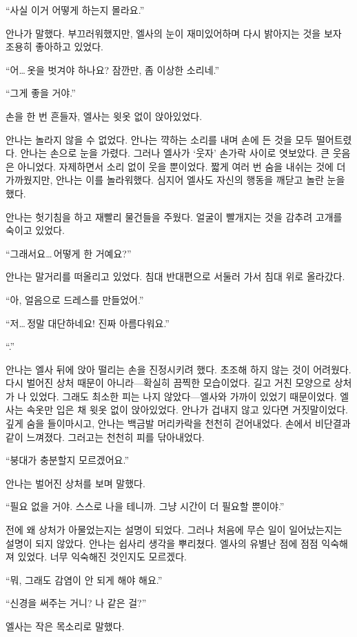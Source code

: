 ``사실 이거 어떻게 하는지 몰라요.''

안나가 말했다. 부끄러워했지만, 엘사의 눈이 재미있어하며 다시 밝아지는 것을 보자 조용히 좋아하고 있었다.

``어\ldots\,옷을 벗겨야 하나요? 잠깐만, 좀 이상한 소리네.''

``그게 좋을 거야.''

손을 한 번 흔들자, 엘사는 윗옷 없이 앉아있었다.

안나는 놀라지 않을 수 없었다. 안나는 꺅하는 소리를 내며 손에 든 것을 모두 떨어트렸다. 안나는 손으로 눈을 가렸다. 그러나 엘사가 `웃자' 손가락 사이로 엿보았다. 큰 웃음은 아니었다. 자제하면서 소리 없이 웃을 뿐이었다. 짧게 여러 번 숨을 내쉬는 것에 더 가까웠지만, 안나는 이를 놀라워했다. 심지어 엘사도 자신의 행동을 깨닫고 놀란 눈을 했다.

안나는 헛기침을 하고 재빨리 물건들을 주웠다. 얼굴이 빨개지는 것을 감추려 고개를 숙이고 있었다.

``그래서요\ldots\,어떻게 한 거예요?''

안나는 말거리를 떠올리고 있었다. 침대 반대편으로 서둘러 가서 침대 위로 올라갔다.

``아, 얼음으로 드레스를 만들었어.''

``저\ldots\,정말 대단하네요! 진짜 아름다워요.''

``.''

안나는 엘사 뒤에 앉아 떨리는 손을 진정시키려 했다. 초조해 하지 않는 것이 어려웠다. 다시 벌어진 상처 때문이 아니라—확실히 끔찍한 모습이었다. 길고 거친 모양으로 상처가 나 있었다. 그래도 최소한 피는 나지 않았다—엘사와 가까이 있었기 때문이었다. 엘사는 속옷만 입은 채 윗옷 없이 앉아있었다. 안나가 겁내지 않고 있다면 거짓말이었다. 깊게 숨을 들이마시고, 안나는 백금발 머리카락을 천천히 걷어내었다. 손에서 비단결과 같이 느껴졌다. 그러고는 천천히 피를 닦아내었다.

``붕대가 충분할지 모르겠어요.''

안나는 벌어진 상처를 보며 말했다.

``필요 없을 거야. 스스로 나을 테니까. 그냥 시간이 더 필요할 뿐이야.''

전에 왜 상처가 아물었는지는 설명이 되었다. 그러나 처음에 무슨 일이 일어났는지는 설명이 되지 않았다. 안나는 쉽사리 생각을 뿌리쳤다. 엘사의 유별난 점에 점점 익숙해져 있었다. 너무 익숙해진 것인지도 모르겠다.

``뭐, 그래도 감염이 안 되게 해야 해요.''

`` 신경을 써주는 거니? 나 같은 걸?''

엘사는 작은 목소리로 말했다.

